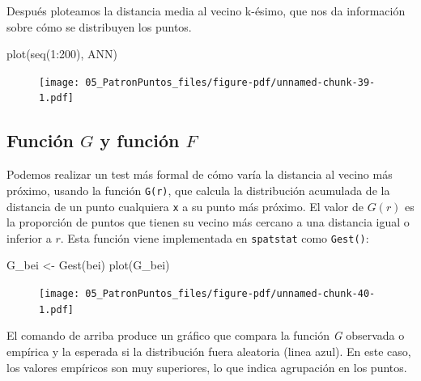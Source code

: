 \documentclass[
  letterpaper,
  DIV=11,
  numbers=noendperiod]{scrreprt}
\newenvironment{Shaded}{\begin{snugshade}}{\end{snugshade}}
\newcommand{\DecValTok}[1]{\textcolor[rgb]{0.68,0.00,0.00}{#1}}
\newcommand{\FunctionTok}[1]{\textcolor[rgb]{0.28,0.35,0.67}{#1}}
\newcommand{\NormalTok}[1]{\textcolor[rgb]{0.00,0.23,0.31}{#1}}
\newcommand{\OtherTok}[1]{\textcolor[rgb]{0.00,0.23,0.31}{#1}}
\newcommand{\SpecialCharTok}[1]{\textcolor[rgb]{0.37,0.37,0.37}{#1}}
\begin{document}
Después ploteamos la distancia media al vecino k-ésimo, que nos da
información sobre cómo se distribuyen los puntos.

\begin{Shaded}
\begin{Highlighting}[]
\FunctionTok{plot}\NormalTok{(}\FunctionTok{seq}\NormalTok{(}\DecValTok{1}\SpecialCharTok{:}\DecValTok{200}\NormalTok{), ANN)}
\end{Highlighting}
\end{Shaded}

\begin{figure}[H]

{\centering \texttt{[image: 05\_PatronPuntos\_files/figure-pdf/unnamed-chunk-39-1.pdf]}

}

\end{figure}

\hypertarget{funciuxf3n-g-y-funciuxf3n-f}{%
\subsection{\texorpdfstring{Función \(G\) y función
\(F\)}{Función G y función F}}\label{funciuxf3n-g-y-funciuxf3n-f}}

Podemos realizar un test más formal de cómo varía la distancia al vecino
más próximo, usando la función \texttt{G(r)}, que calcula la
distribución acumulada de la distancia de un punto cualquiera \texttt{x}
a su punto más próximo. El valor de \(G(r)\) es la proporción de puntos
que tienen su vecino más cercano a una distancia igual o inferior a
\(r\). Esta función viene implementada en \texttt{spatstat} como
\texttt{Gest()}:

\begin{Shaded}
\begin{Highlighting}[]
\NormalTok{G\_bei }\OtherTok{\textless{}{-}} \FunctionTok{Gest}\NormalTok{(bei)}
\FunctionTok{plot}\NormalTok{(G\_bei)}
\end{Highlighting}
\end{Shaded}

\begin{figure}[H]

{\centering \texttt{[image: 05\_PatronPuntos\_files/figure-pdf/unnamed-chunk-40-1.pdf]}

}

\end{figure}

El comando de arriba produce un gráfico que compara la función \emph{G}
observada o empírica y la esperada si la distribución fuera aleatoria
(linea azul). En este caso, los valores empíricos son muy superiores, lo
que indica agrupación en los puntos.
\end{document}
